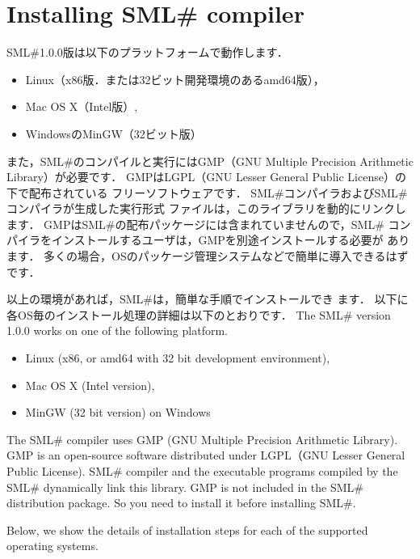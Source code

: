 \documentclass{jbook}
\newcommand{\txt}[2]{#2}
\newcommand{\smlsharp}{SML\#}
\newcommand{\version}{1.0.0}
\begin{document}
\section{
\txt{\smlsharp{}コンパイラのインストール}
    {Installing \smlsharp{} compiler}}
\label{sec:tutorialInstall}

\ifx\jp%
	\smlsharp{}\version{}版は以下のプラットフォームで動作します．
\begin{itemize}
\item Linux（x86版．または32ビット開発環境のあるamd64版），
\item Mac OS X（Intel版）,
\item WindowsのMinGW（32ビット版）
\end{itemize}

	また，\smlsharp{}のコンパイルと実行にはGMP（GNU Multiple Precision
Arithmetic Library）が必要です．
	GMPはLGPL（GNU Lesser General Public License）の下で配布されている
フリーソフトウェアです． 
	\smlsharp{}コンパイラおよび\smlsharp{}コンパイラが生成した実行形式
ファイルは，このライブラリを動的にリンクします．
	GMPは\smlsharp{}の配布パッケージには含まれていませんので，\smlsharp{}
コンパイラをインストールするユーザは，GMPを別途インストールする必要が
あります．
	多くの場合，OSのパッケージ管理システムなどで簡単に導入できるはずです．

	以上の環境があれば，\smlsharp{}は，簡単な手順でインストールでき
ます．
	以下に各OS毎のインストール処理の詳細は以下のとおりです．
\else%
	The \smlsharp{} version \version{} works on one of the following
platform.
\begin{itemize}
\item Linux (x86, or amd64 with 32 bit development environment),
\item Mac OS X (Intel version),
\item MinGW (32 bit version) on Windows 
\end{itemize}


	The \smlsharp{} compiler uses GMP (GNU Multiple Precision
Arithmetic Library).
	GMP is an open-source software distributed under LGPL（GNU
Lesser General Public License).
	\smlsharp{} compiler and the executable programs compiled by the
\smlsharp{} dynamically link this library.
	GMP is not included in the \smlsharp{} distribution package.
	So you need to install it before installing \smlsharp.

	Below, we show the details of installation steps for each of the
supported operating systems.
\fi%
\end{document}
